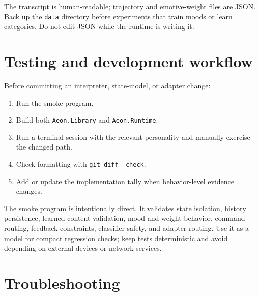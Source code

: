 \documentclass[11pt,a4paper]{article}
\begin{document}
The transcript is human-readable; trajectory and emotive-weight files are JSON. Back up the \texttt{data} directory before experiments that train moods or learn categories. Do not edit JSON while the runtime is writing it.

\section{Testing and development workflow}

Before committing an interpreter, state-model, or adapter change:

\begin{enumerate}
  \item Run the smoke program.
  \item Build both \texttt{Aeon.Library} and \texttt{Aeon.Runtime}.
  \item Run a terminal session with the relevant personality and manually exercise the changed path.
  \item Check formatting with \texttt{git diff --check}.
  \item Add or update the implementation tally when behavior-level evidence changes.
\end{enumerate}

The smoke program is intentionally direct. It validates state isolation, history persistence, learned-content validation, mood and weight behavior, command routing, feedback constraints, classifier safety, and adapter routing. Use it as a model for compact regression checks; keep tests deterministic and avoid depending on external devices or network services.

\section{Troubleshooting}
\end{document}
